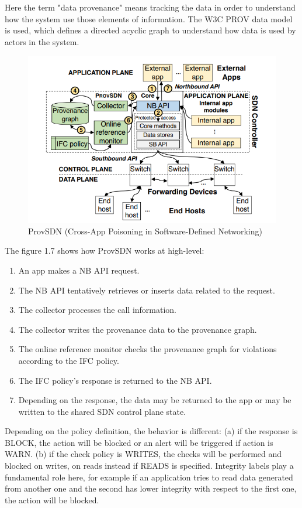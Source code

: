 Here the term "data provenance" means tracking the data in order to understand how the system use those elements of information. The W3C PROV data model is used, which defines a directed acyclic graph to understand how data is used by actors in the system.

\begin{figure}[h]
\caption{ProvSDN (Cross-App Poisoning in Software-Defined Networking)}
\label{fig:provsdn}
\includegraphics[width=1\textwidth]{resources/Chapter-1/provsdn.png}
\centering
\end{figure}

The figure 1.7 shows how ProvSDN works at high-level:
\begin{enumerate}
    \item An app makes a NB API request. 
    \item The NB API tentatively retrieves or inserts data related to the request.
    \item The collector processes the call information.
    \item The collector writes the provenance data to the provenance graph.
    \item The online reference monitor checks the provenance graph for violations according to the IFC policy.
    \item The IFC policy’s response is returned to the NB API.
    \item Depending on the response, the data may be returned to the app or may be written to the shared SDN control plane state.
\end{enumerate}


Depending on the policy definition, the behavior is different: (a) if the response is BLOCK, the action will be blocked or an alert will be triggered if action is WARN. (b) if the check policy is WRITES, the checks will be performed and blocked on writes, on reads instead if READS is specified. Integrity labels play a fundamental role here, for example if an application tries to read data generated from another one and the second has lower integrity with respect to the first one, the action will be blocked.

